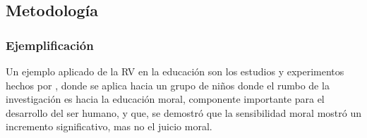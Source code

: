 \subsection{Metodología}

\subsubsection{Ejemplificación}

Un ejemplo aplicado de la RV en la educación son los estudios y experimentos hechos por \parencite{SHIM2023100010}, donde se aplica hacia un grupo de niños donde el rumbo de la investigación es hacia la educación moral, componente importante para el desarrollo del ser humano, y que, se demostró que la sensibilidad moral mostró un incremento significativo, mas no el juicio moral.
